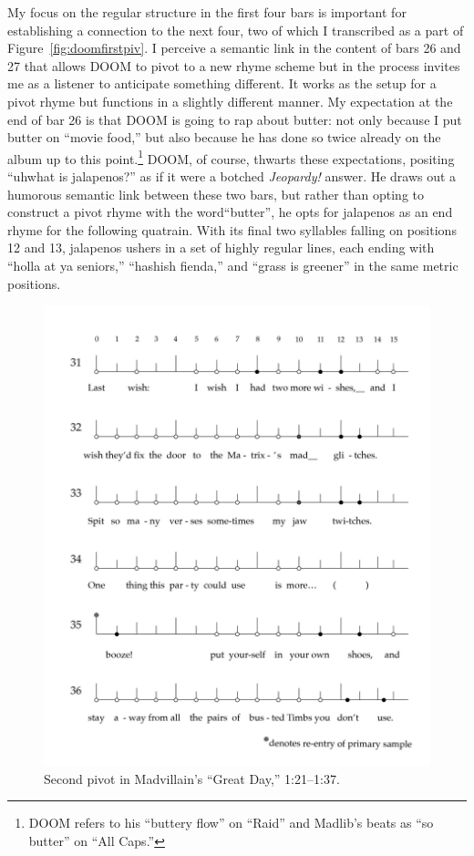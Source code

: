 My focus on the regular structure in the first four bars is important for establishing a connection
to the next four, two of which I transcribed as a part of Figure~\ref{fig:doomfirstpiv}. I perceive 
a semantic link in the content of bars 26 and 27 that allows DOOM to pivot to a new rhyme scheme but
in the process invites me as a listener to anticipate something different. It works as the setup for
a pivot rhyme but functions in a slightly different manner. My expectation at the end  of bar 26 is 
that DOOM is going to rap about butter: not only because I put butter on ``movie food,'' but also 
because he has done so twice already on the album up to this point.\footnote{
    DOOM refers to his ``buttery flow'' on ``Raid'' and Madlib's beats as ``so butter'' on ``All 
    Caps.''}
DOOM, of course, thwarts these expectations, positing ``uh\textellipsis what is jalapenos?'' as 
if  it were a botched  \textit{Jeopardy!} answer. He draws out a humorous semantic link between
these two bars, but rather than opting to construct a pivot rhyme with the word``butter'', he 
opts for jalapenos as an end rhyme for the following quatrain. With its final two syllables 
falling on positions 12 and 13, jalapenos ushers in a set of highly regular lines, each ending
with ``holla at ya  seniors,'' ``hashish fienda,'' and ``grass is greener'' in the same metric
positions.

    \begin{figure}[!p]
        \centering
        \includegraphics{images/figures/chp 03/121137greatdaysecondpivot.pdf}
        \caption{Second pivot in Madvillain's ``Great Day,'' 1:21--1:37.}
        \label{fig:doomsecondpiv}
    \end{figure}

